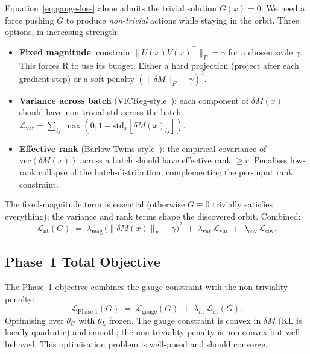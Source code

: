 \documentclass[11pt, a4paper]{article}
\theoremstyle{plain}
\theoremstyle{definition}
\theoremstyle{remark}
\begin{document}
Equation~\ref{eq:gauge-loss} alone admits the trivial solution $G(x) = 0$.
We need a force pushing $G$ to produce \emph{non-trivial} actions while staying in the orbit.
Three options, in increasing strength:
\begin{itemize}[nosep]
\item \textbf{Fixed magnitude}: constrain $\|U(x) V(x)^{\!\top}\|_{F} = \gamma$ for a chosen scale $\gamma$. This forces R to use its budget. Either a hard projection (project after each gradient step) or a soft penalty $(\|\delta M\|_{F} - \gamma)^{2}$.
\item \textbf{Variance across batch} (VICReg-style~\cite{bardes2022vicreg}): each component of $\delta M(x)$ should have non-trivial std across the batch. $\mathcal{L}_{\text{var}} = \sum_{ij} \max(0, 1 - \mathrm{std}_{x}[\delta M(x)_{ij}])$.
\item \textbf{Effective rank} (Barlow Twins-style~\cite{zbontar2021barlow}): the empirical covariance of $\mathrm{vec}(\delta M(x))$ across a batch should have effective rank $\geq r$. Penalises low-rank collapse of the batch-distribution, complementing the per-input rank constraint.
\end{itemize}
The fixed-magnitude term is essential (otherwise $G \equiv 0$ trivially satisfies everything); the variance and rank terms shape the discovered orbit.
Combined:
\begin{equation}
\mathcal{L}_{\text{nt}}(G) \;=\; \lambda_{\text{mag}}\,\big( \|\delta M(x)\|_{F} - \gamma \big)^{2} \;+\; \lambda_{\text{var}}\, \mathcal{L}_{\text{var}} \;+\; \lambda_{\text{cov}}\, \mathcal{L}_{\text{cov}}.
\end{equation}

\subsection{Phase~1 Total Objective}

The Phase~1 objective combines the gauge constraint with the non-triviality penalty:
\begin{equation}
\mathcal{L}_{\text{Phase 1}}(G) \;=\; \mathcal{L}_{\text{gauge}}(G) \;+\; \lambda_{\text{nt}}\, \mathcal{L}_{\text{nt}}(G).
\label{eq:phase1-total}
\end{equation}
Optimising over $\theta_{G}$ with $\theta_{L}$ frozen.
The gauge constraint is convex in $\delta M$ (KL is locally quadratic) and smooth; the non-triviality penalty is non-convex but well-behaved.
This optimisation problem is well-posed and should converge.
\end{document}
